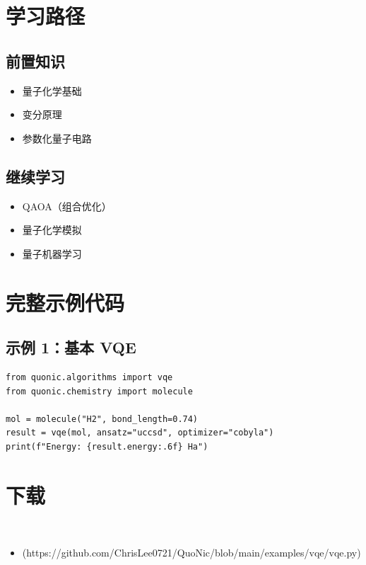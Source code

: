 \documentclass[12pt,a4paper]{article}
\begin{document}
\section{学习路径}

\subsection{前置知识}
\begin{itemize}
  \item 量子化学基础
  \item 变分原理
  \item 参数化量子电路
\end{itemize}

\subsection{继续学习}
\begin{itemize}
  \item QAOA（组合优化）
  \item 量子化学模拟
  \item 量子机器学习
\end{itemize}

\section{完整示例代码}

\subsection{示例 1：基本 VQE}

\begin{lstlisting}[style=python]
from quonic.algorithms import vqe
from quonic.chemistry import molecule

mol = molecule("H2", bond_length=0.74)
result = vqe(mol, ansatz="uccsd", optimizer="cobyla")
print(f"Energy: {result.energy:.6f} Ha")
\end{lstlisting}


\section{下载}

\begin{itemize}
  \item [vqe.py](https://github.com/ChrisLee0721/QuoNic/blob/main/examples/vqe/vqe.py)
\end{itemize}
\end{document}

